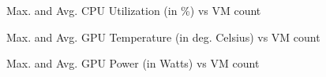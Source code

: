 \documentclass[a4paper,12pt, final]{report}
\begin{document}
\begin{figure}[H]
    \centering
    \caption{Max. and Avg. CPU Utilization (in \%) vs VM count}
    \label{fig:max_avg_cpu_util_vs_vm_count}
\end{figure}

\begin{figure}[H]
    \centering
    \caption{Max. and Avg. GPU Temperature (in deg. Celsius) vs VM count}
    \label{fig:max_avg_gpu_temp_vs_vm_count}
\end{figure}

\begin{figure}[H]
    \centering
    \caption{Max. and Avg. GPU Power (in Watts) vs VM count}
    \label{fig:max_avg_gpu_power_vs_vm_count}
\end{figure}
\end{document}

